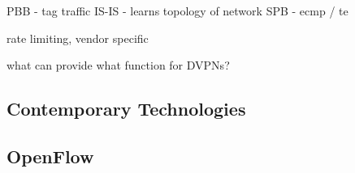 PBB - tag traffic
IS-IS - learns topology of network
SPB - ecmp / te

rate limiting, vendor specific

what can provide what function for DVPNs?

\subsection{Contemporary Technologies} %
\label{sub:contemporary_technologies}


\subsection{OpenFlow} %
\label{sub:openflow}


